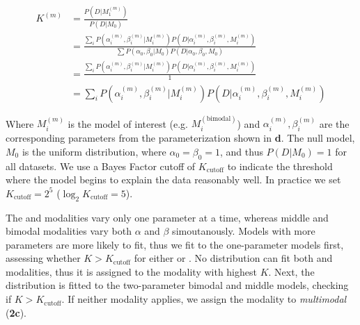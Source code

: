 \begin{align}
K^{(m)}
&= \frac{P(D | M_1^{(m)})}{P(D | M_0)}\\
&=
\frac{\sum_{i} P(\alpha_i^{(m)}, \beta_i^{(m)} | M_i^{(m)}) P(D | \alpha_i^{(m)}, \beta_i^{(m)}, M_i^{(m)})}
{\sum P(\alpha_0, \beta_0 | M_0) P(D | \alpha_0, \beta_0, M_0)}\\
&=
\frac{\sum_{i} P(\alpha_i^{(m)}, \beta_i^{(m)} | M_i^{(m)}) P(D | \alpha_i^{(m)}, \beta_i^{(m)}, M_i^{(m)})}
{1}\\
&=
\sum_{i} P(\alpha_i^{(m)}, \beta_i^{(m)} | M_i^{(m)}) P(D | \alpha_i^{(m)}, \beta_i^{(m)}, M_i^{(m)})
\end{align}

Where $M_i^{(m)}$ is the model of interest (e.g. $M_i^{(\mathrm{bimodal})}$) and $\alpha_i^{(m)}, \beta_i^{(m)}$ are the corresponding parameters from the parameterization shown in \textbf{d}. The null model, $M_0$ is the uniform distribution, where $\alpha_0 = \beta_0 = 1$, and thus $P(D|M_0) = 1$ for all datasets. We use a Bayes Factor cutoff of $K_{\mathrm{cutoff}}$ to indicate the threshold where the model begins to explain the data reasonably well. In practice we set $K_{\mathrm{cutoff}} = 2^{5}$ ($\log_2 K_\mathrm{cutoff} = 5$).

The \0 and \1 modalities vary only one parameter at a time, whereas middle and bimodal modalities vary both $\alpha$ and $\beta$ simoutanously. Models with more parameters are more likely to fit, thus we fit to the one-parameter models first, assessing whether $K > K_{\mathrm{cutoff}}$ for either \0 or \1. No distribution can fit both \0 and \1 modalities, thus it is assigned to the modality with highest $K$. Next, the distribution is fitted to the two-parameter bimodal and middle models, checking if $K > K_{\mathrm{cutoff}}$. If neither modality applies, we assign the modality to \emph{multimodal} (\textbf{2c}).

